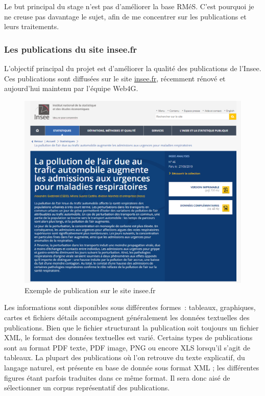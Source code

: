 Le but principal du stage n'est pas d'améliorer la base RMéS. C'est pourquoi je ne creuse pas davantage le sujet, afin de me concentrer sur les publications et leurs traitements.
\label{section 1.2.1 - Premières tentatives}

\subsubsection{Les publications du site insee.fr}

L'objectif principal du projet est d'améliorer la qualité des publications de l'Insee. Ces publications sont diffusées sur le site \href{https://insee.fr/fr/accueil}{insee.fr}, récemment rénové et aujourd'hui maintenu par l'équipe Web4G.
\newline

\begin{figure}[H]
    \centering
    \includegraphics[scale=0.52]{images/insee-fr-exemple.png}
    \caption{Exemple de publication sur le site insee.fr}
    \label{fig:insee.fr}
\end{figure}

Les informations sont disponibles sous différentes formes~: tableaux, graphiques, cartes et fichiers détails accompagnent généralement les données textuelles des publications. Bien que le fichier structurant la publication soit toujours un fichier XML, le format des données textuelles est varié. Certains types de publications sont au format PDF texte, PDF image, PNG ou encore XLS lorsqu'il s'agit de tableaux. La plupart des publications où l'on retrouve du texte explicatif, du langage naturel, est présente en base de donnée sous format XML ; les différentes figures étant parfois traduites dans ce même format. Il sera donc aisé de sélectionner un corpus représentatif des publications. 
\newline

